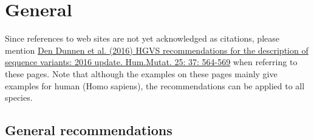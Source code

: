 \chapter{General}

Since references to web sites are not yet acknowledged as citations, please mention \href{http://onlinelibrary.wiley.com/doi/10.1002/humu.22981/pdf}{Den Dunnen et al. (2016) HGVS recommendations for the description of sequence variants: 2016 update. Hum.Mutat. 25: 37: 564-569} when referring to these pages. Note that although the examples on these pages mainly give examples for human (Homo sapiens), the recommendations can be applied to all species.

\section{General recommendations}

